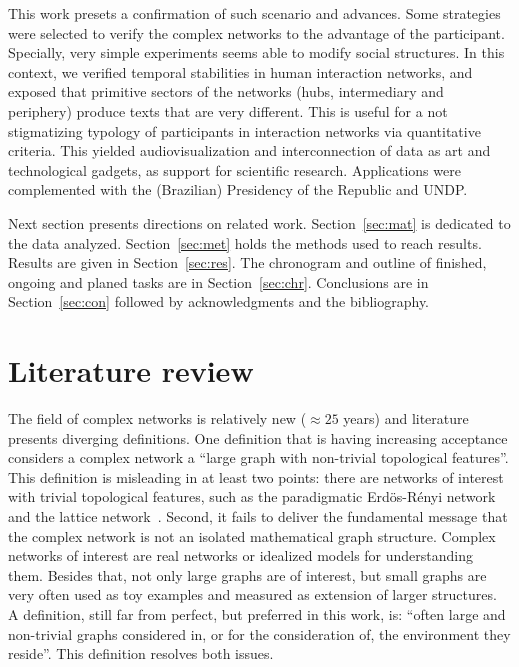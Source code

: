 \documentclass[a4paper,openright,12pt]{report} %
\begin{document}
This work presets a confirmation of such scenario and advances.
Some strategies were selected to verify the complex networks to the
advantage of the participant. Specially, very simple experiments
seems able to modify social structures. In this context, we verified
temporal stabilities in human interaction networks, and exposed that
primitive sectors of the networks (hubs, intermediary and periphery)
produce texts that are very different. This is useful for a
not stigmatizing typology of participants in interaction networks
via quantitative criteria. This yielded audiovisualization and
interconnection of data as art and technological gadgets, 
as support for scientific research. Applications were complemented
with the (Brazilian) Presidency of the Republic and UNDP.

Next section presents directions on related work. Section~\ref{sec:mat} is dedicated to the data analyzed. Section~\ref{sec:met} holds the methods used to reach results. Results are given in Section~\ref{sec:res}. The chronogram and outline of finished, ongoing and planed tasks are in Section~\ref{sec:chr}. Conclusions are in Section~\ref{sec:con} followed by acknowledgments and the bibliography.

\section{Literature review}
The field  of complex networks is relatively new ($\approx 25$ years)
and literature presents diverging definitions.
One definition that is having increasing acceptance
considers a complex network a ``large graph with non-trivial topological features''.
This definition is misleading in at least two points: there are networks of interest with trivial topological features, such as the paradigmatic Erdös-Rényi network and the lattice network~\cite{newman}. 
Second, it fails to deliver the fundamental message that the complex network is not an isolated mathematical graph structure. Complex networks of interest are real networks or idealized models for understanding them. Besides that, not only large graphs are of interest, but small graphs are very often used as toy examples and measured as extension of larger structures.
A definition, still far from perfect, but preferred in this work, is:
``often large and non-trivial graphs considered in,
or for the consideration of, 
the environment they reside''.
This definition resolves both issues.
\end{document}
